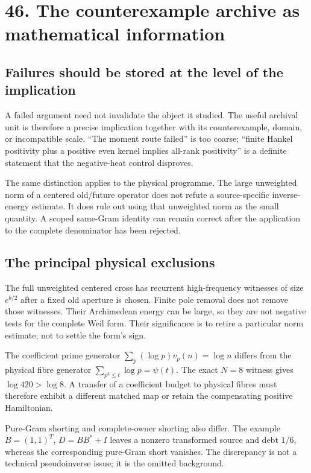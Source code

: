 \documentclass[
  10pt,
  a4paper,
  10pt,
  oneside,
  openany]{book}
\begin{document}
\section{46. The counterexample archive as mathematical
information}\label{ch-obstructions}

\subsection{Failures should be stored at the level of the
implication}\label{failures-should-be-stored-at-the-level-of-the-implication}

A failed argument need not invalidate the object it studied. The useful
archival unit is therefore a precise implication together with its
counterexample, domain, or incompatible scale. ``The moment route
failed'' is too coarse; ``finite Hankel positivity plus a positive even
kernel implies all-rank positivity'' is a definite statement that the
negative-heat control disproves.

The same distinction applies to the physical programme. The large
unweighted norm of a centered old/future operator does not refute a
source-specific inverse-energy estimate. It does rule out using that
unweighted norm as the small quantity. A scoped same-Gram identity can
remain correct after the application to the complete denominator has
been rejected.

\subsection{The principal physical
exclusions}\label{the-principal-physical-exclusions}

The full unweighted centered cross has recurrent high-frequency
witnesses of size \(e^{b/2}\) after a fixed old aperture is chosen.
Finite pole removal does not remove those witnesses. Their Archimedean
energy can be large, so they are not negative tests for the complete
Weil form. Their significance is to retire a particular norm estimate,
not to settle the form's sign.

The coefficient prime generator \(\sum_p(\log p)v_p(n)=\log n\) differs
from the physical fibre generator \(\sum_{p^k\le t}\log p=\psi(t)\). The
exact \(N=8\) witness gives \(\log420>\log8\). A transfer of a
coefficient budget to physical fibres must therefore exhibit a different
matched map or retain the compensating positive Hamiltonian.

Pure-Gram shorting and complete-owner shorting also differ. The example
\(B=(1,1)^T\), \(D=BB^*+I\) leaves a nonzero transformed source and debt
\(1/6\), whereas the corresponding pure-Gram short vanishes. The
discrepancy is not a technical pseudoinverse issue; it is the omitted
background.
\end{document}
